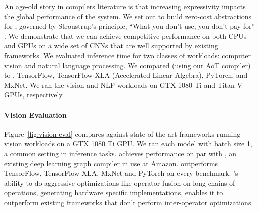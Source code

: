   \begin{figure}[h]
  \end{figure}

  \begin{figure}[h]
  \end{figure}

  An age-old story in compilers literature is that increasing expressivity
    impacts the global performance of the system.
  We set out to build zero-cost abstractions for \relay,
    governed by Stroustrup's principle, ``What you don't use, you don't pay
    for'' \cite{bjarne}.
  We demonstrate that we can achieve competitive performance on both CPUs and
    GPUs on a wide set of CNNs that are well supported by existing frameworks.
  We evaluated inference time for two classes of workloads: computer vision and natural language processing.
  We compared \relay (using our AoT compiler) to \nnvm,
    TensorFlow, TensorFlow-XLA (Accelerated Linear Algebra), PyTorch, and MxNet.
  We ran the vision and NLP workloads on GTX 1080 Ti and Titan-V GPUs, respectively.

  \paragraph{Vision Evaluation}
  Figure~\ref{fig:vision-eval} compares \relay against state of the art frameworks
    running vision workloads on a GTX 1080 Ti GPU.
  We ran each model with
    batch size 1, a common setting in inference tasks.
  \relay achieves performance on par with \nnvm,
    an existing deep learning graph compiler in use at Amazon.
  \relay outperforms TensorFlow, TensorFlow-XLA, MxNet and
    PyTorch on every benchmark.
  \relay's ability to do aggressive optimizations like operator
    fusion on long chains of operations, generating hardware
    specific implementations, enables it to outperform
    existing frameworks that don't perform inter-operator optimizations.

